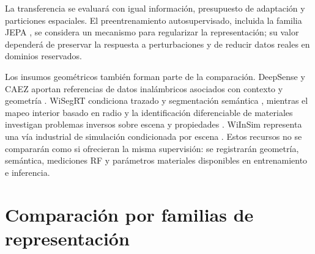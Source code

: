 La transferencia se evaluará con igual información, presupuesto de adaptación y
particiones espaciales. El preentrenamiento autosupervisado, incluida la familia JEPA
\citep{Assran2023IJEPA,Kim2026WiFiJEPA}, se considera un mecanismo para regularizar
la representación; su valor dependerá de preservar la respuesta a perturbaciones y de
reducir datos reales en dominios reservados.

Los insumos geométricos también forman parte de la comparación. DeepSense y CAEZ
aportan referencias de datos inalámbricos asociados con contexto y geometría
\citep{Alkhateeb2022DeepSense,ETHCAEZ,Zumegen2024CAEZWiFi}. WiSegRT condiciona
trazado y segmentación semántica \citep{Zhang2023WiSegRT}, mientras el mapeo interior
basado en radio y la identificación diferenciable de materiales investigan problemas
inversos sobre escena y propiedades \citep{Milosheski2026IndoorMapping,Chen2026RFMatID}.
WiInSim representa una vía industrial de simulación condicionada por escena
\citep{QualcommWiInSim}. Estos recursos no se compararán como si ofrecieran la misma
supervisión: se registrarán geometría, semántica, mediciones RF y parámetros materiales
disponibles en entrenamiento e inferencia.

\section{Comparación por familias de representación}

